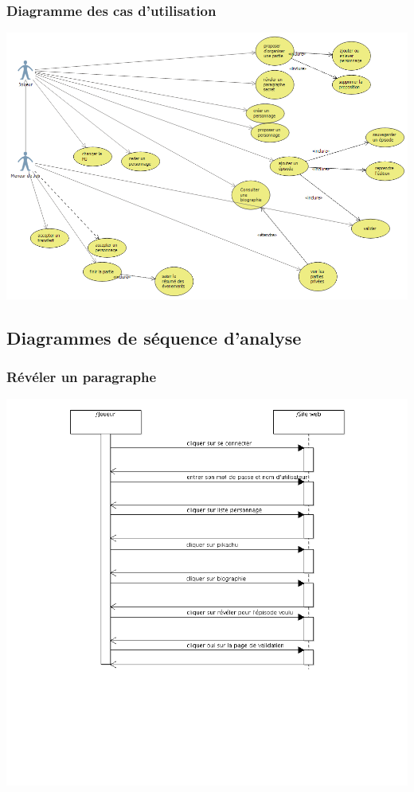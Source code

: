 \documentclass[a4paper, 11pt, titlepage]{article}
\begin{document}
\subsubsection{Diagramme des cas d'utilisation}

\begin{center}
    \includegraphics[scale=0.7,angle=90]{analyse/usecases}
\end{center}


\newpage
\subsection{Diagrammes de séquence d'analyse}

\subsubsection{Révéler un paragraphe}

\begin{center}
\includegraphics[scale=0.55]{sequence/RevelerParagAnalyse.png}
\end{center}
\end{document}
